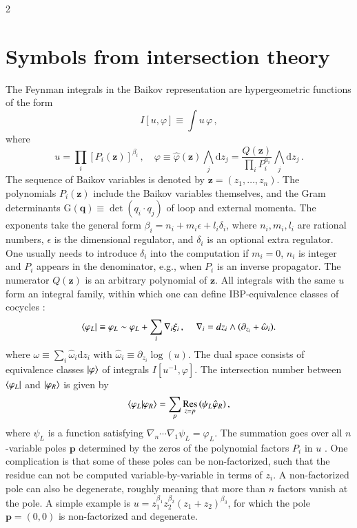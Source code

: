 \documentclass[fleqn]{2023SCGE}
\newcommand{\nd}{\mathrm{d}}
\newcommand{\nG}{\mathrm{G}}
\DeclareMathOperator{\Res}{Res}
\begin{document}
\begin{multicols}{2}
\section{Symbols from intersection theory}

The Feynman integrals in the Baikov representation are hypergeometric functions of the form 
%
\begin{equation}
	I[u,\varphi] \equiv \int  u \, \varphi \,, %
\end{equation}
where
\begin{equation}
    u=\prod_i \left[P_i(\bm{z})\right]^{\beta_i} \,,
    \quad
    \varphi \equiv \hat{\varphi}(\bm{z}) \bigwedge_j \nd z_j =\frac{Q(\bm{z})}{\prod_i P_i^{a_i}} \bigwedge_j \nd z_j \,. \label{eq:baikov}
\end{equation}
The sequence of Baikov variables is denoted by $\bm{z}=(z_1,\ldots,z_n)$.
The polynomials $P_i(\bm{z})$ include the Baikov variables themselves, and the Gram determinants $\nG(\bm{q})\equiv\det(q_i \cdot q_j)$ of loop and external momenta.
{  The exponents take the general form $\beta_i = n_i + m_i\epsilon + l_i \delta_i$, where $n_i,m_i,l_i$ are rational numbers, $\epsilon$ is the dimensional regulator, and $\delta_i$ is an optional extra regulator. One usually needs to introduce $\delta_i$ into the computation if $m_i=0$, $n_i$ is integer and $P_i$ appears in the denominator, e.g., when $P_i$ is an inverse propagator.}
The numerator $Q(\bm{z})$ is an arbitrary polynomial of $\bm{z}$.
{  All integrals with the same $u$ form an integral family, within which one can define IBP-equivalence classes of cocycles \cite{Mastrolia:2018uzb, Frellesvig:2019uqt, Mizera:2019ose, Chestnov:2022xsy}:
\begin{equation}
\bra{\varphi_L} \equiv \varphi_L \sim \varphi_L + \sum_i \nabla_i \xi_i \,, \, \quad \nabla_{i} = dz_i \wedge (\partial_{z_i} + \hat{\omega}_i) . \label{eq:braket}
\end{equation}}
where $\omega \equiv \sum_i \hat{\omega}_i \nd z_i$ with $\hat{\omega}_i \equiv \partial_{z_i} \log(u)$.
The dual space consists of equivalence classes $\ket{\varphi}$ of integrals $I[u^{-1},\varphi]$.
The intersection number between $\bra{\varphi_L}$ and $\ket{\varphi_R}$ is given by
\begin{equation}
	\braket{\varphi_L|\varphi_R} = \sum_{\bm{p}} \Res_{\bm{z} = \bm{p}} \left(\psi_L \hat{\varphi}_R\right) , \label{eq:intnum}
\end{equation}
where $\psi_L$ is a function satisfying $\nabla_n \cdots \nabla_1 \psi_L = \varphi_L$. The summation goes over all $n$-variable poles $\bm{p}$ determined by the zeros of the polynomial factors $P_i$ in $u$ \cite{Larsen:2017aqb}. One complication is that some of these poles can be non-factorized, such that the residue can not be computed variable-by-variable in terms of $z_i$. A non-factorized pole can also be degenerate, roughly meaning that more than $n$ factors vanish at the pole.
A simple example is $u=z_1^{\beta_1} z_2^{\beta_2} (z_1+z_2)^{\beta_3}$, for which the pole $\bm{p}=(0,0)$ is non-factorized and degenerate.


\end{multicols}
\end{document}
